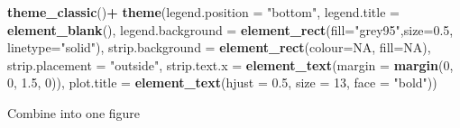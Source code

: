 \documentclass[
]{article}
\newenvironment{Shaded}{\begin{snugshade}}{\end{snugshade}}
\newcommand{\DataTypeTok}[1]{\textcolor[rgb]{0.13,0.29,0.53}{#1}}
\newcommand{\DecValTok}[1]{\textcolor[rgb]{0.00,0.00,0.81}{#1}}
\newcommand{\FloatTok}[1]{\textcolor[rgb]{0.00,0.00,0.81}{#1}}
\newcommand{\KeywordTok}[1]{\textcolor[rgb]{0.13,0.29,0.53}{\textbf{#1}}}
\newcommand{\NormalTok}[1]{#1}
\newcommand{\OperatorTok}[1]{\textcolor[rgb]{0.81,0.36,0.00}{\textbf{#1}}}
\newcommand{\OtherTok}[1]{\textcolor[rgb]{0.56,0.35,0.01}{#1}}
\newcommand{\StringTok}[1]{\textcolor[rgb]{0.31,0.60,0.02}{#1}}
\begin{document}
\begin{Shaded}
\begin{Highlighting}[]
\StringTok{  }\KeywordTok{theme\_classic}\NormalTok{()}\OperatorTok{+}
\StringTok{  }\KeywordTok{theme}\NormalTok{(}\DataTypeTok{legend.position =} \StringTok{"bottom"}\NormalTok{, }\DataTypeTok{legend.title =} \KeywordTok{element\_blank}\NormalTok{(), }\DataTypeTok{legend.background =} \KeywordTok{element\_rect}\NormalTok{(}\DataTypeTok{fill=}\StringTok{"grey95"}\NormalTok{,}\DataTypeTok{size=}\FloatTok{0.5}\NormalTok{, }\DataTypeTok{linetype=}\StringTok{"solid"}\NormalTok{), }\DataTypeTok{strip.background =} \KeywordTok{element\_rect}\NormalTok{(}\DataTypeTok{colour=}\OtherTok{NA}\NormalTok{, }\DataTypeTok{fill=}\OtherTok{NA}\NormalTok{), }\DataTypeTok{strip.placement =} \StringTok{"outside"}\NormalTok{, }\DataTypeTok{strip.text.x =} \KeywordTok{element\_text}\NormalTok{(}\DataTypeTok{margin =} \KeywordTok{margin}\NormalTok{(}\DecValTok{0}\NormalTok{, }\DecValTok{0}\NormalTok{, }\FloatTok{1.5}\NormalTok{, }\DecValTok{0}\NormalTok{)), }\DataTypeTok{plot.title =} \KeywordTok{element\_text}\NormalTok{(}\DataTypeTok{hjust =} \FloatTok{0.5}\NormalTok{, }\DataTypeTok{size =} \DecValTok{13}\NormalTok{, }\DataTypeTok{face =} \StringTok{"bold"}\NormalTok{))}
\end{Highlighting}
\end{Shaded}

Combine into one figure
\end{document}

